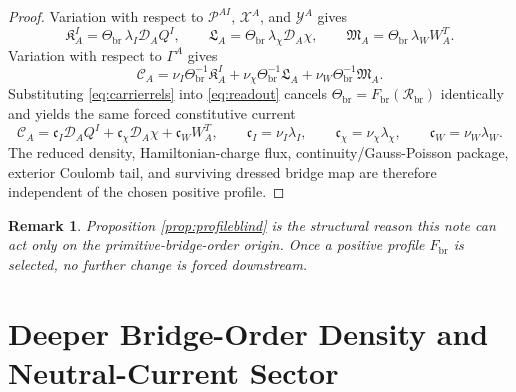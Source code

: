\documentclass[11pt]{article}
\newcommand{\SpatialD}{\mathcal D}
\newcommand{\ConstCurrent}{\mathcal C}
\newcommand{\ConstGamma}{\Gamma}
\newcommand{\CurvQMult}{\mathscr P}
\newcommand{\CurvChiMult}{\mathscr X}
\newcommand{\CurvTransMult}{\mathscr Y}
\newcommand{\CurvSeed}{\Theta_{\mathrm{br}}}
\newcommand{\CurvProfile}{F_{\mathrm{br}}}
\newcommand{\CurvOneI}{\mathfrak K}
\newcommand{\CurvOneChi}{\mathfrak L}
\newcommand{\CurvOneW}{\mathfrak M}
\newcommand{\BridgeCurv}{\mathcal R_{\mathrm{br}}}
\newtheorem{remark}{Remark}
\begin{document}
\begin{proof}
Variation with respect to \(\CurvQMult^{AI}\), \(\CurvChiMult^A\), and \(\CurvTransMult^A\) gives
\begin{equation}
\CurvOneI_A^I=\CurvSeed\,\lambda_I\SpatialD_AQ^I,
\qquad
\CurvOneChi_A=\CurvSeed\,\lambda_\chi\SpatialD_A\chi,
\qquad
\CurvOneW_A=\CurvSeed\,\lambda_WW_A^T.
\label{eq:carrierrels}
\end{equation}
Variation with respect to \(\ConstGamma^A\) gives
\begin{equation}
\ConstCurrent_A
=
\nu_I\CurvSeed^{-1}\CurvOneI_A^I
+\nu_\chi\CurvSeed^{-1}\CurvOneChi_A
+\nu_W\CurvSeed^{-1}\CurvOneW_A.
\label{eq:readout}
\end{equation}
Substituting \eqref{eq:carrierrels} into \eqref{eq:readout} cancels \(\CurvSeed=\CurvProfile(\BridgeCurv)\) identically and yields the same forced constitutive current
\begin{equation}
\ConstCurrent_A
=
\mathfrak c_I\SpatialD_AQ^I
+\mathfrak c_\chi\SpatialD_A\chi
+\mathfrak c_WW_A^T,
\qquad
\mathfrak c_I=\nu_I\lambda_I,
\qquad
\mathfrak c_\chi=\nu_\chi\lambda_\chi,
\qquad
\mathfrak c_W=\nu_W\lambda_W.
\label{eq:forcedcurrent}
\end{equation}
The reduced density, Hamiltonian-charge flux, continuity/Gauss-Poisson package, exterior Coulomb tail, and surviving dressed bridge map are therefore independent of the chosen positive profile.
\end{proof}

\begin{remark}
Proposition \ref{prop:profileblind} is the structural reason this note can act only on the primitive-bridge-order origin. Once a positive profile \(\CurvProfile\) is selected, no further change is forced downstream.
\end{remark}

\section{Deeper Bridge-Order Density and Neutral-Current Sector}
\end{document}
